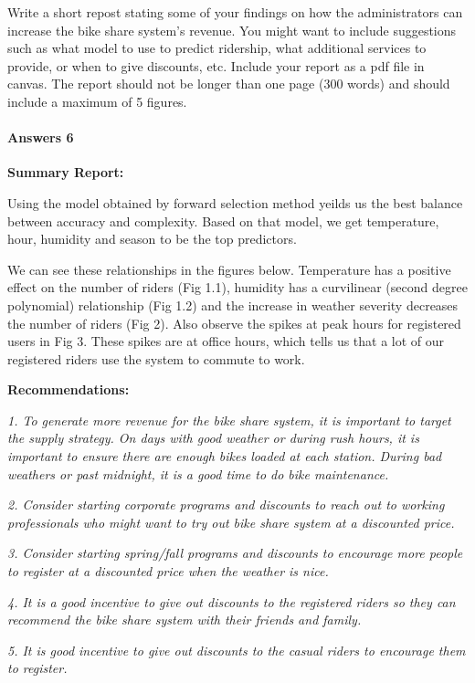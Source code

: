 \documentclass[11pt]{article}
\begin{document}
Write a short repost stating some of your findings on how the
administrators can increase the bike share system's revenue. You might
want to include suggestions such as what model to use to predict
ridership, what additional services to provide, or when to give
discounts, etc. Include your report as a pdf file in canvas. The report
should not be longer than one page (300 words) and should include a
maximum of 5 figures.

    \paragraph{Answers 6}\label{answers-6}

    \textbf{Summary Report:}

Using the model obtained by forward selection method yeilds us the best
balance between accuracy and complexity. Based on that model, we get
temperature, hour, humidity and season to be the top predictors.

We can see these relationships in the figures below. Temperature has a
positive effect on the number of riders (Fig 1.1), humidity has a
curvilinear (second degree polynomial) relationship (Fig 1.2) and the
increase in weather severity decreases the number of riders (Fig 2).
Also observe the spikes at peak hours for registered users in Fig 3.
These spikes are at office hours, which tells us that a lot of our
registered riders use the system to commute to work.

\textbf{Recommendations:}

\emph{1. To generate more revenue for the bike share system, it is
important to target the supply strategy. On days with good weather or
during rush hours, it is important to ensure there are enough bikes
loaded at each station. During bad weathers or past midnight, it is a
good time to do bike maintenance.}

\emph{2. Consider starting corporate programs and discounts to reach out
to working professionals who might want to try out bike share system at
a discounted price.}

\emph{3. Consider starting spring/fall programs and discounts to
encourage more people to register at a discounted price when the weather
is nice.}

\emph{4. It is a good incentive to give out discounts to the registered
riders so they can recommend the bike share system with their friends
and family.}

\emph{5. It is good incentive to give out discounts to the casual riders
to encourage them to register.}
\end{document}
